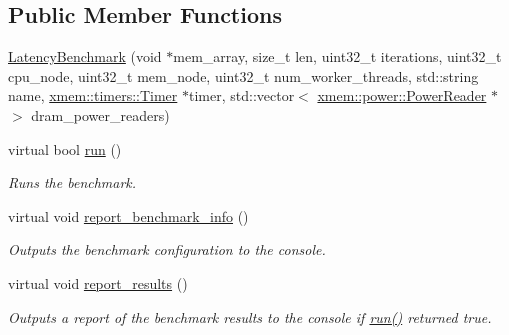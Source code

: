 \subsection*{Public Member Functions}
\begin{DoxyCompactItemize}
\item 
\hyperlink{classxmem_1_1benchmark_1_1_latency_benchmark_a485434e0f506427b28073a2a3e287e21}{Latency\+Benchmark} (void $\ast$mem\+\_\+array, size\+\_\+t len, uint32\+\_\+t iterations, uint32\+\_\+t cpu\+\_\+node, uint32\+\_\+t mem\+\_\+node, uint32\+\_\+t num\+\_\+worker\+\_\+threads, std\+::string name, \hyperlink{classxmem_1_1timers_1_1_timer}{xmem\+::timers\+::\+Timer} $\ast$timer, std\+::vector$<$ \hyperlink{classxmem_1_1power_1_1_power_reader}{xmem\+::power\+::\+Power\+Reader} $\ast$ $>$ dram\+\_\+power\+\_\+readers)
\item 
virtual bool \hyperlink{classxmem_1_1benchmark_1_1_latency_benchmark_ab68c299bf41fb30f9be597ff79188139}{run} ()
\begin{DoxyCompactList}\small\item\em Runs the benchmark. \end{DoxyCompactList}\item 
\hypertarget{classxmem_1_1benchmark_1_1_latency_benchmark_a2714dfbf9be2eef8ac4089ad610db651}{}virtual void \hyperlink{classxmem_1_1benchmark_1_1_latency_benchmark_a2714dfbf9be2eef8ac4089ad610db651}{report\+\_\+benchmark\+\_\+info} ()\label{classxmem_1_1benchmark_1_1_latency_benchmark_a2714dfbf9be2eef8ac4089ad610db651}

\begin{DoxyCompactList}\small\item\em Outputs the benchmark configuration to the console. \end{DoxyCompactList}\item 
\hypertarget{classxmem_1_1benchmark_1_1_latency_benchmark_ae16f89eb9f413734989ef8c51ec3e066}{}virtual void \hyperlink{classxmem_1_1benchmark_1_1_latency_benchmark_ae16f89eb9f413734989ef8c51ec3e066}{report\+\_\+results} ()\label{classxmem_1_1benchmark_1_1_latency_benchmark_ae16f89eb9f413734989ef8c51ec3e066}

\begin{DoxyCompactList}\small\item\em Outputs a report of the benchmark results to the console if \hyperlink{classxmem_1_1benchmark_1_1_latency_benchmark_ab68c299bf41fb30f9be597ff79188139}{run()} returned true. \end{DoxyCompactList}\end{DoxyCompactItemize}
